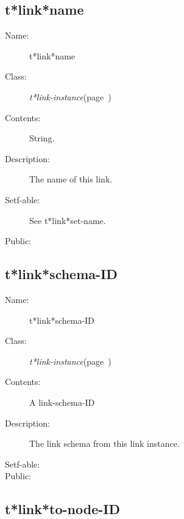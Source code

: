 \subsection{t*link*name}
\label{t*link*name}

\begin{description}
\item [Name:]  t*link*name

\item [Class:] {\sl t*link-instance}\hfill(page~\pageref{t*link-instance})

\item [Contents:]
String.

\item [Description:]

The name of this link.

\item [Setf-able:] See t*link*set-name.


\item [Public:]



\end{description}
\horizontalline

\subsection{t*link*schema-ID}
\label{t*link*schema-ID}

\begin{description}
\item [Name:]  t*link*schema-ID

\item [Class:] {\sl t*link-instance}\hfill(page~\pageref{t*link-instance})

\item [Contents:]
A link-schema-ID

\item [Description:]

The link schema from this link instance.

\item [Setf-able:]


\item [Public:]



\end{description}
\horizontalline

\subsection{t*link*to-node-ID}
\label{t*link*to-node-ID}

